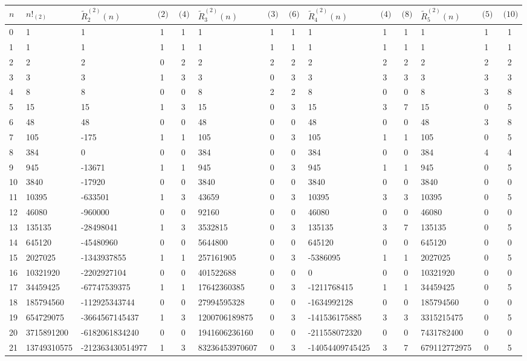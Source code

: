 \documentclass[12pt,reqno]{article}
\numberwithin{sfootnote}{section}
\newcommand{\tabletopstrut}[0]{\rule{0pt}{3ex}}
\numberwithin{equation}{section}
\theoremstyle{plain}
\theoremstyle{definition}
\theoremstyle{remark}
\newcommand{\MultiFactorial}[2]{\ensuremath{#1!_{\left(#2\right)}}}
\begin{document}
\begin{sidewaystable} 
\centering 
\smaller 

\begin{tabular}{|l|l|lcc|lcc|lcc|lcc|} \hline 
\hline\tabletopstrut 
$n$ & $\MultiFactorial{n}{2}$ & 
$\widetilde{R}_2^{(2)}(n)$ & $\pod{2}$ & $\pod{4}$ &
$\widetilde{R}_3^{(2)}(n)$ & $\pod{3}$ & $\pod{6}$ &
$\widetilde{R}_4^{(2)}(n)$ & $\pod{4}$ & $\pod{8}$ &
$\widetilde{R}_5^{(2)}(n)$ & $\pod{5}$ & $\pod{10}$ \\ \hline 
 0 & 1 & 1 & 1 & 1 & 1 & 1 & 1 & 1 & 1 & 1 & 1 & 1 & 1 \\
 1 & 1 & 1 & 1 & 1 & 1 & 1 & 1 & 1 & 1 & 1 & 1 & 1 & 1 \\
 2 & 2 & 2 & 0 & 2 & 2 & 2 & 2 & 2 & 2 & 2 & 2 & 2 & 2 \\
 3 & 3 & 3 & 1 & 3 & 3 & 0 & 3 & 3 & 3 & 3 & 3 & 3 & 3 \\
 4 & 8 & 8 & 0 & 0 & 8 & 2 & 2 & 8 & 0 & 0 & 8 & 3 & 8 \\
 5 & 15 & 15 & 1 & 3 & 15 & 0 & 3 & 15 & 3 & 7 & 15 & 0 & 5 \\
 6 & 48 & 48 & 0 & 0 & 48 & 0 & 0 & 48 & 0 & 0 & 48 & 3 & 8 \\
 7 & 105 & -175 & 1 & 1 & 105 & 0 & 3 & 105 & 1 & 1 & 105 & 0 & 5 \\
 8 & 384 & 0 & 0 & 0 & 384 & 0 & 0 & 384 & 0 & 0 & 384 & 4 & 4 \\
 9 & 945 & -13671 & 1 & 1 & 945 & 0 & 3 & 945 & 1 & 1 & 945 & 0 & 5 \\
 10 & 3840 & -17920 & 0 & 0 & 3840 & 0 & 0 & 3840 & 0 & 0 & 3840 & 0 & 0 \\
 11 & 10395 & -633501 & 1 & 3 & 43659 & 0 & 3 & 10395 & 3 & 3 & 10395 & 0 & 5 \\
 12 & 46080 & -960000 & 0 & 0 & 92160 & 0 & 0 & 46080 & 0 & 0 & 46080 & 0 & 0 \\
 13 & 135135 & -28498041 & 1 & 3 & 3532815 & 0 & 3 & 135135 & 3 & 7 & 135135 & 0 & 5 \\
 14 & 645120 & -45480960 & 0 & 0 & 5644800 & 0 & 0 & 645120 & 0 & 0 & 645120 & 0 & 0 \\
 15 & 2027025 & -1343937855 & 1 & 1 & 257161905 & 0 & 3 & -5386095 & 1 & 1 & 2027025 & 0 & 5 \\
 16 & 10321920 & -2202927104 & 0 & 0 & 401522688 & 0 & 0 & 0 & 0 & 0 & 10321920 & 0 & 0 \\
 17 & 34459425 & -67747539375 & 1 & 1 & 17642360385 & 0 & 3 & -1211768415 & 1 & 1 & 34459425 & 0 & 5 \\
 18 & 185794560 & -112925343744 & 0 & 0 & 27994595328 & 0 & 0 & -1634992128 & 0 & 0 & 185794560 & 0 & 0 \\
 19 & 654729075 & -3664567145437 & 1 & 3 & 1200706189875 & 0 & 3 & -141536175885 & 3 & 3 & 3315215475 & 0 & 5 \\
 20 & 3715891200 & -6182061834240 & 0 & 0 & 1941606236160 & 0 & 0 & -211558072320 & 0 & 0 & 7431782400 & 0 & 0 \\
 21 & 13749310575 & -212363430514977 & 1 & 3 & 83236453970607 & 0 & 3 & -14054409745425 & 3 & 7 & 679112772975 & 0 & 5 \\
\hline\hline
\end{tabular} 


\end{sidewaystable}
\end{document}
